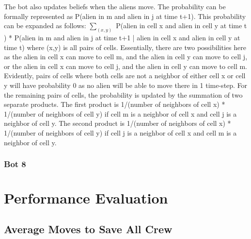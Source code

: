 \documentclass[11pt]{article}
\begin{document}
The bot also updates beliefs when the aliens move. The probability can be formally represented as P(alien in m and alien in j at time t+1). This probability can be expanded as follows: $\sum_{(x,y) }$ P(alien in cell x and alien in cell y at time t ) * P(alien in m and alien in j at time t+1 | alien in cell x and alien in cell y at time t) where (x,y) is all pairs of cells. Essentially, there are two possibilities here as the alien in cell x can move to cell m, and the alien in cell y can move to cell j, or the alien in cell x can move to cell j, and the alien in cell y can move to cell m. Evidently, pairs of cells where both cells are not a neighbor of either cell x or cell y will have probability 0 as no alien will be able to move there in 1 time-step. For the remaining pairs of cells, the probability is updated by the summation of two separate products. The first product is 1/(number of neighbors of cell x) * 1/(number of neighbors of cell y) if cell m is a neighbor of cell x and cell j is a neighbor of cell y. The second product is 1/(number of neighbors of cell x) * 1/(number of neighbors of cell y) if cell j is a neighbor of cell x and cell m is a neighbor of cell y. 


\subsubsection{Bot 8}





\section{Performance Evaluation}

\subsection{Average Moves to Save All Crew}
\end{document}
